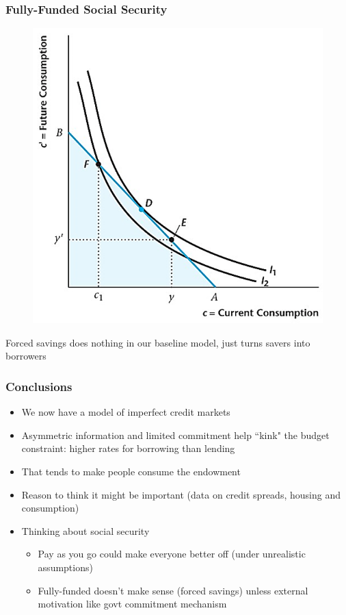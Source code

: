 \documentclass{beamer}
\begin{document}
\begin{frame}
\frametitle[alignment=center]{Fully-Funded Social Security}
\begin{figure}
\centering
\includegraphics[scale=0.7]{Figures/W_Fig_10pt10.png}
\end{figure}
Forced savings does nothing in our baseline model, just turns savers into borrowers
 \end{frame}

 \begin{frame}
\frametitle[alignment=center]{Conclusions}
\begin{itemize}
\item We now have a model of imperfect credit markets
\bigskip
\item Asymmetric information and limited commitment help ``kink" the budget constraint: higher rates for borrowing than lending
\bigskip
\item That tends to make people consume the endowment
\bigskip
\item Reason to think it might be important (data on credit spreads, housing and consumption)
\bigskip
\item Thinking about social security
\begin{itemize}
\item Pay as you go could make everyone better off (under unrealistic assumptions)
\item Fully-funded doesn't make sense (forced savings) unless external motivation like govt commitment mechanism
\end{itemize}
\end{itemize}
 \end{frame}
\end{document}
